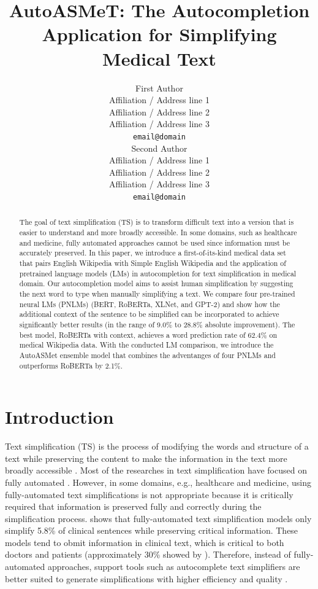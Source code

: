 \documentclass[11pt]{article}
\title{AutoASMeT: The Autocompletion Application for Simplifying Medical Text}
\author{First Author \\
  Affiliation / Address line 1 \\
  Affiliation / Address line 2 \\
  Affiliation / Address line 3 \\
  {\tt email@domain} \\\And
  Second Author \\
  Affiliation / Address line 1 \\
  Affiliation / Address line 2 \\
  Affiliation / Address line 3 \\
  {\tt email@domain} \\}
\date{}
\begin{document}
\maketitle
\begin{abstract} 
  The goal of text simplification (TS) is to transform difficult text into a version that is easier to understand and more broadly accessible.  In some domains, such as healthcare and medicine, fully automated approaches cannot be used since information must be accurately preserved. In this paper, we introduce a first-of-its-kind medical data set that pairs English Wikipedia with Simple English Wikipedia and the application of pretrained language models (LMs) in autocompletion for text simplification in medical domain. Our autocompletion model aims to assist human simplification by suggesting the next word to type when manually simplifying a text. We compare four pre-trained neural LMs (PNLMs) (BERT, RoBERTa, XLNet, and GPT-2) and show how the additional context of the sentence to be simplified can be incorporated to achieve significantly better results (in the range of 9.0\% to 28.8\% absolute improvement). The best model, RoBERTa with context, achieves a word prediction rate of 62.4\% on medical Wikipedia data. With the conducted LM comparison, we introduce the AutoASMet ensemble model that combines the adventanges of four PNLMs and outperforms RoBERTa by 2.1\%.

\end{abstract}

\section{Introduction}

Text simplification (TS) is the process of modifying the words and structure of a text while preserving the content to make the information in the text more broadly accessible \cite{shardlow2014survey}. Most of the researches in text simplification have focused on fully automated \cite{zhu10,coster2011learning,xu2016optimizing,zhang2017sentence,nishihara2019controllable}. However, in some domains, e.g., healthcare and medicine, using fully-automated text simplifications is not appropriate because it is critically required that information is preserved fully and correctly during the simplification process. \cite{shardlow2019neural} shows that fully-automated text simplification models only simplify 5.8\% of clinical sentences while preserving critical information. These models tend to obmit information in clinical text, which is critical to both doctors and patients (approximately 30\% showed by \cite{shardlow2019neural}). Therefore, instead of fully-automated approaches, support tools such as autocomplete text simplifiers are better suited to generate simplifications with higher efficiency and quality \cite{kloehn2018jmir}.
\end{document}
